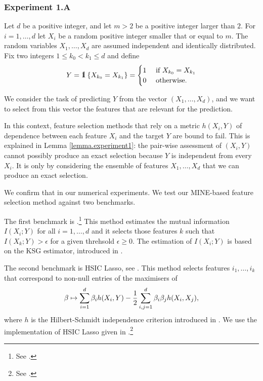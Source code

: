 \subsubsection{Experiment 1.A}
Let
$d$
be a positive integer,
and 
let 
$m > 2$
be  a positive integer larger than $2$.
For
$i = 1, \dots, d$
let
$X_i$
be a random  positive integer
smaller that or equal to $m$.
The random variables
$X_1, \dots, X_d$
are assumed independent and identically distributed.
Fix 
two integers
$ 1 \leq k_0 < k_1 \leq d$
and 
define
\begin{equation}
	\label{eq.exp1Y}
	Y = \one\left\lbrace
	X_{k_0} = X_{k_1}
	\right
	\rbrace
	=
	\begin{cases}
		1 & \text{ if } X_{k_0} = X_{k_1}
		\\
		0 & \text{ otherwise}.
	\end{cases}
\end{equation}

We consider the task of predicting $Y$ from the vector 
$(X_1, \dots, X_d)$,
and 
we want to select 
from this vector 
the features that are relevant for the prediction.

In this context,
feature selection methods
that rely on a metric $h(X_i, Y)$ of dependence between 
each feature $X_i$ and the target $Y$ are bound to fail.
This is explained in Lemma \ref{lemma.experiment1}:
the pair-wise assessment of $(X_i, Y)$ 
cannot possibly produce an exact selection
because $Y$ is independent from every $X_i$. 
It is only by considering 
the ensemble of features $X_1, \dots, X_d$ 
that we can produce an exact selection.

We confirm that in our numerical experiments. 
We test 
our MINE-based feature selection method 
against 
two benchmarks.

The first benchmark is 
.\footnote{
See
.
}
This method estimates the mutual information 
$I(X_i; Y)$ for all $i = 1, \dots, d$
and 
it selects those features $k$ such that 
$I(X_k; Y) > \epsilon$
for a given threhsold $\epsilon \geq 0$. 
The estimation of $I(X_i; Y)$ is based on the KSG estimator, 
introduced in 
\cite{KSG04est}.

The second benchmark is
HSIC Lasso,
see 
\cite{YJSXS14hig}.
This method 
selects features $i_1, \dots, i_k$
that correspond to non-null entries of the 
maximisers of 
\begin{equation*}
	\beta \mapsto 
	\sum_{i=1}^{d} \beta_i h(X_i, Y)
	-\frac{1}{2}
	\sum_{i,j = 1}^{d} \beta_i \beta_j h(X_i, X_j),
\end{equation*}
where $h$ is the Hilbert-Schmidt independence criterion 
introduced in 
\cite{GBSS05mea}.
We use the implementation of HSIC Lasso
given in
.\footnote{
See .
}

